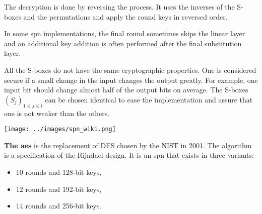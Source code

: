 \documentclass[11pt]{sdm}
\begin{document}
The decryption is done by reversing the process.
It uses the inverses of the S-boxes and the permutations and apply the round keys in reversed order.

In some \gls{spn} implementations, the final round sometimes skips the linear layer and an additional key addition is often performed after the final substitution layer.

All the S-boxes do not have the same cryptographic properties.
One is considered secure if a small change in the input changes the output greatly.
For example, one input bit should change almost half of the output bits on average.
The S-boxes $(S_j)_{1\leq j \leq l}$ can be chosen identical to ease the implementation and assure that one is not weaker than the others.

\begin{center}
    \texttt{[image: ../images/spn\_wiki.png]}
    \captionsetup{hypcap=false}
    \label{fig_spn}
\end{center}

\textbf{The \acrfull{aes}} is the replacement of DES chosen by the NIST in 2001.
The algorithm is a specification of the Rijndael design.
It is an \gls{spn} that exists in three variants:
\begin{itemize}
    \item 10 rounds and 128-bit keys,
    \item 12 rounds and 192-bit keys,
    \item 14 rounds and 256-bit keys.
\end{itemize}
\end{document}
